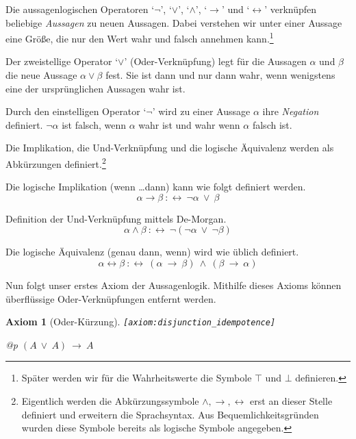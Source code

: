 \documentclass[a4paper,german,10pt,twoside]{book}
\newtheorem{ax}{Axiom}
\theoremstyle{definition}
\theoremstyle{remark}
\begin{document}
\par
Die aussagenlogischen Operatoren \mbox{`$\neg$'}, \mbox{`$\vee$'}, \mbox{`$\wedge$'}, \mbox{`$\rightarrow$'} und \mbox{`$\leftrightarrow$'} verkn{\"u}pfen beliebige \emph{Aussagen} zu neuen Aussagen. 
Dabei verstehen wir unter einer Aussage eine Gr{\"o}{\ss}e, die nur den Wert {\glqq wahr\grqq} und {\glqq falsch\grqq} annehmen kann.\footnote{Sp{\"a}ter werden wir f{\"u}r die Wahrheitswerte die Symbole $\top$ und $\bot$ definieren.}

Der zweistellige Operator \mbox{`$\vee$'} (Oder-Verkn{\"u}pfung) legt f{\"u}r die Aussagen $\alpha$ und $\beta$ die neue Aussage 
$\alpha \vee \beta$ fest. Sie ist dann und nur dann wahr, wenn wenigstens eine der urspr{\"u}nglichen Aussagen wahr ist.

\par
Durch den einstelligen Operator \mbox{`$\neg$'} wird zu einer Aussage $\alpha$ ihre \emph{Negation} definiert. $\neg \alpha$ ist falsch, wenn $\alpha$ wahr ist und wahr wenn $\alpha$ falsch ist.
            
\par
Die Implikation, die Und-Verkn{\"u}pfung und die logische {\"A}quivalenz werden als Abk{\"u}rzungen definiert.\footnote{Eigentlich werden die Abk{\"u}rzungssymbole $\wedge, \rightarrow, \leftrightarrow$ erst an dieser Stelle definiert und erweitern die Sprachsyntax. Aus Bequemlichkeitsgr{\"u}nden wurden diese Symbole bereits als logische Symbole angegeben.}


Die logische Implikation ({\glqq wenn \ldots dann\glqq}) kann wie folgt definiert werden.
$$\alpha \rightarrow \beta\ :\leftrightarrow \ \neg \alpha\ \lor\ \beta$$


Definition der Und-Verkn{\"u}pfung mittels De-Morgan.
$$\alpha \land \beta\ :\leftrightarrow \ \neg (\neg \alpha\ \lor\ \neg \beta)$$


Die logische {\"A}quivalenz ({\glqq genau dann, wenn\grqq}) wird wie 
{\"u}blich definiert.
$$\alpha \leftrightarrow \beta\ :\leftrightarrow \ (\alpha\ \rightarrow\ \beta)\ \land\ (\beta\ \rightarrow\ \alpha)$$


\par
Nun folgt unser erstes Axiom der Aussagenlogik. Mithilfe dieses 
Axioms k{\"o}nnen {\"u}berfl{\"u}ssige Oder-Verkn{\"u}pfungen entfernt werden.

\begin{ax}[Oder-K{\"u}rzung]
\label{axiom:disjunction_idempotence} \hypertarget{axiom:disjunction_idempotence}{}
{\tt \tiny [\verb]axiom:disjunction_idempotence]]}
\mbox{}
\begin{longtable}{{@{\extracolsep{\fill}}p{\linewidth}}}
\centering $(A\ \lor\ A)\ \rightarrow\ A$
\end{longtable}

\end{ax}
\end{document}
